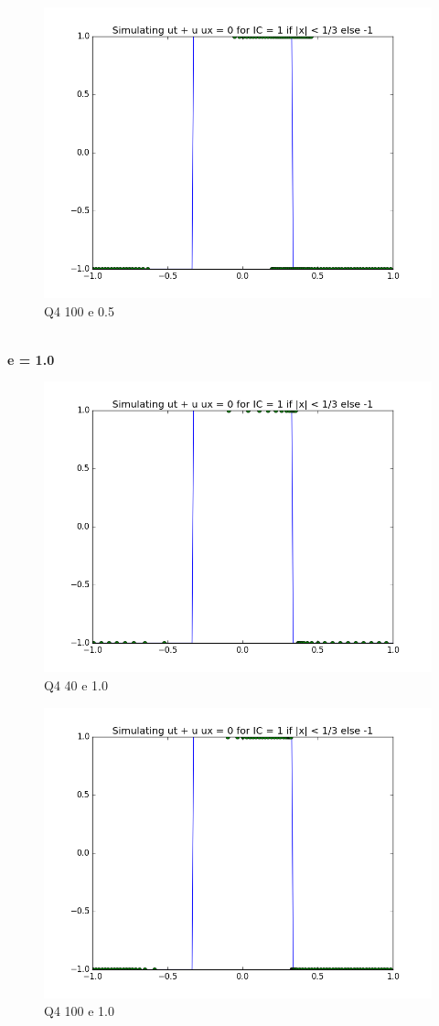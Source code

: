 \documentclass[a4paper,11pt]{article}
\begin{document}
\begin{figure}[ht]
    \centering
    \includegraphics[width=.8\linewidth]{q4_100_05.png}
    \caption{Q4 100 e 0.5}
    \label{fig:ex10}    
\end{figure}
\newpage
\indent\\
\newpage
\indent \textbf{e = 1.0}
\begin{figure}[ht]
    \centering
    \includegraphics[width=.8\linewidth]{q4_40_1.png}
    \caption{Q4 40 e 1.0}
    \label{fig:ex11}    
\end{figure}

\begin{figure}[ht]
    \centering
    \includegraphics[width=.8\linewidth]{q4_100_1.png}
    \caption{Q4 100 e 1.0}
    \label{fig:ex12}    
\end{figure}
\end{document}
